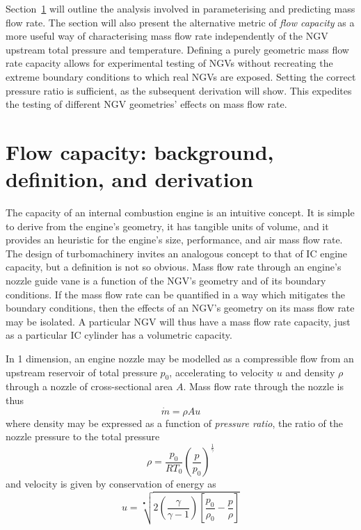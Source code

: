 \documentclass[a4paper, 11pt, oneside]{report}
\begin{document}
Section~\ref{flow_capacity_background_definition_and_derivation} will outline the analysis involved in parameterising and predicting mass flow rate. The section will also present the alternative metric of \textit{flow capacity} as a more useful way of characterising mass flow rate independently of the NGV upstream total pressure and temperature. Defining a purely geometric mass flow rate capacity allows for experimental testing of NGVs without recreating the extreme boundary conditions to which real NGVs are exposed. Setting the correct pressure ratio is sufficient, as the subsequent derivation will show. This expedites the testing of different NGV geometries' effects on mass flow rate.


\section{Flow capacity: background, definition, and derivation}
\label{flow_capacity_background_definition_and_derivation}

The capacity of an internal combustion engine is an intuitive concept. It is simple to derive from the engine's geometry, it has tangible units of volume, and it provides an heuristic for the engine's size, performance, and air mass flow rate. The design of turbomachinery invites an analogous concept to that of IC engine capacity, but a definition is not so obvious. Mass flow rate through an engine's nozzle guide vane is a function of the NGV's geometry and of its boundary conditions. If the mass flow rate can be quantified in a way which mitigates the boundary conditions, then the effects of an NGV's geometry on its mass flow rate may be isolated. A particular NGV will thus have a mass flow rate capacity, just as a particular IC cylinder has a volumetric capacity.

In 1 dimension, an engine nozzle may be modelled as a compressible flow from an upstream reservoir of total pressure $p_0$, accelerating to velocity $u$ and density $\rho$ through a nozzle of cross-sectional area $A$. Mass flow rate through the nozzle is thus
\begin{equation}
\dot{m} = \rho A u
\end{equation}
where density may be expressed as a function of \textit{pressure ratio}, the ratio of the nozzle pressure to the total pressure
\begin{equation}
\rho = \frac{p_0}{R T_0} \left(\frac{p}{p_0}\right)^\frac{1}{\gamma}
\end{equation}
and velocity is given by conservation of energy as
\begin{equation}\label{compressible_bernouilli}
u =
\sqrt[•]{ 
	2 \left( \frac{\gamma}{\gamma - 1} \right) \left[ \frac{p_0}{\rho_0} - \frac{p}{\rho} \right] 
}
\end{equation}
\end{document}
